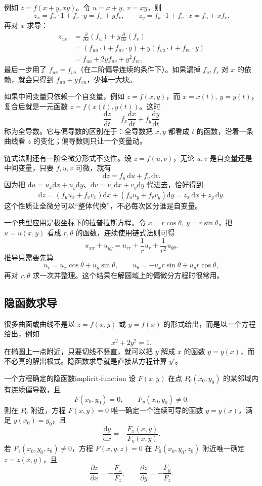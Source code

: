 例如 \(z=f(x+y,xy)\)。令 \(u=x+y,\ v=xy\)，则
\[
    z_x=f_u\cdot1+f_v\cdot y=f_u+y f_v,\qquad
    z_y=f_u\cdot1+f_v\cdot x=f_u+x f_v.
\]
再对 \(x\) 求导：
\[
\begin{aligned}
    z_{xx}
    &=\frac{\partial}{\partial x}(f_u)+y\frac{\partial}{\partial x}(f_v)\\
    &=(f_{uu}\cdot1+f_{uv}\cdot y)+y(f_{vu}\cdot1+f_{vv}\cdot y)\\
    &=f_{uu}+2y f_{uv}+y^2 f_{vv},
\end{aligned}
\]
最后一步用了 \(f_{uv}=f_{vu}\)（在二阶偏导连续的条件下）。如果漏掉 \(f_u,f_v\) 对 \(x\) 的依赖，就会只得到 \(f_{uu}+y f_{vu}\)，少掉一大块。

如果中间变量只依赖一个自变量，例如 \(z=f(x,y)\)，而 \(x=x(t),\ y=y(t)\)，复合后就是一元函数 \(z=f(x(t),y(t))\)。这时
\[
    \frac{\mathrm{d}z}{\mathrm{d}t}
    =f_x\frac{\mathrm{d}x}{\mathrm{d}t}+f_y\frac{\mathrm{d}y}{\mathrm{d}t}
\]
称为全导数。它与偏导数的区别在于：全导数把 \(x,y\) 都看成 \(t\) 的函数，沿着一条曲线看 \(z\) 的变化；偏导数则只让一个变量动。

链式法则还有一阶全微分形式不变性。设 \(z=f(u,v)\)，无论 \(u,v\) 是自变量还是中间变量，只要 \(f,u,v\) 可微，就有
\[
    \mathrm{d}z=f_u\,\mathrm{d}u+f_v\,\mathrm{d}v.
\]
因为把 \(\mathrm{d}u=u_x\mathrm{d}x+u_y\mathrm{d}y\)、\(\mathrm{d}v=v_x\mathrm{d}x+v_y\mathrm{d}y\) 代进去，恰好得到
\[
    \mathrm{d}z=(f_u u_x+f_v v_x)\mathrm{d}x+(f_u u_y+f_v v_y)\mathrm{d}y
    =z_x\,\mathrm{d}x+z_y\,\mathrm{d}y.
\]
这个性质让全微分可以“整体代换”，不必每次区分谁是自变量。

一个典型应用是极坐标下的拉普拉斯方程。令 \(x=r\cos\theta,\ y=r\sin\theta\)，把 \(u=u(x,y)\) 看成 \(r,\theta\) 的函数，连续使用链式法则可得
\[
    u_{xx}+u_{yy}
    =u_{rr}+\frac1r u_r+\frac1{r^2}u_{\theta\theta}.
\]
推导只需要先算
\[
    u_r=u_x\cos\theta+u_y\sin\theta,\qquad
    u_\theta=-u_x r\sin\theta+u_y r\cos\theta,
\]
再对 \(r,\theta\) 求一次并整理。这个结果在解圆域上的偏微分方程时很常用。

\subsection{隐函数求导}

很多曲面或曲线不是以 \(z=f(x,y)\) 或 \(y=f(x)\) 的形式给出，而是以一个方程给出，例如
\[
    x^2+2y^2=1.
\]
在椭圆上一点附近，只要切线不竖直，就可以把 \(y\) 解成 \(x\) 的函数 \(y=y(x)\)，而不必真的解出根式。隐函数求导就是直接从方程计算 \(y'\)。

\begin{conclusion}{一个方程确定的隐函数}{implicit-function}
    设 \(F(x,y)\) 在点 \(P_0(x_0,y_0)\) 的某邻域内有连续偏导数，且
    \[
        F(x_0,y_0)=0,\qquad F_y(x_0,y_0)\neq0.
    \]
    则在 \(P_0\) 附近，方程 \(F(x,y)=0\) 唯一确定一个连续可导的函数 \(y=y(x)\)，满足 \(y(x_0)=y_0\)，且
    \[
        \frac{\mathrm{d}y}{\mathrm{d}x}
        =-\frac{F_x(x,y)}{F_y(x,y)}.
    \]
    若 \(F_z(x_0,y_0,z_0)\neq0\)，方程 \(F(x,y,z)=0\) 在 \(P_0(x_0,y_0,z_0)\) 附近唯一确定 \(z=z(x,y)\)，且
    \[
        \frac{\partial z}{\partial x}=-\frac{F_x}{F_z},\qquad
        \frac{\partial z}{\partial y}=-\frac{F_y}{F_z}.
    \]
\end{conclusion}

